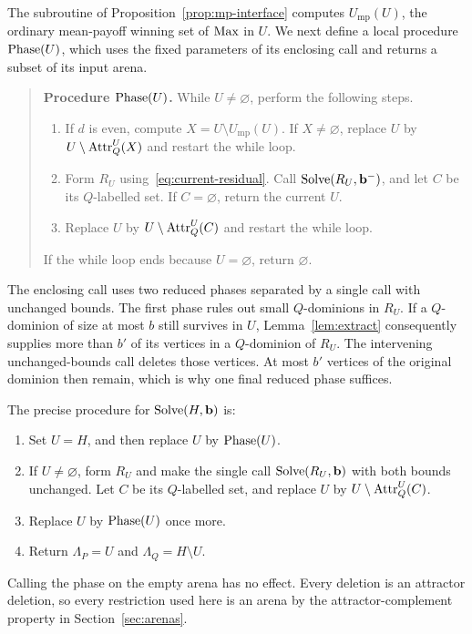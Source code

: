 The subroutine of Proposition~\ref{prop:mp-interface} computes
$U_{\mathrm{mp}}(U)$, the ordinary mean-payoff winning set of $\mathrm{Max}$
in $U$.  We next define a local procedure $\operatorname{Phase}(U)$, which uses the
fixed parameters of its enclosing call and returns a subset of its
input arena.

\begin{quote}
\textbf{Procedure $\operatorname{Phase}(U)$.}
While $U\ne\varnothing$, perform the following steps.
\begin{enumerate}
\item If $d$ is even, compute $X=U\setminus U_{\mathrm{mp}}(U)$.
      If $X\ne\varnothing$, replace
      $U$ by $U\setminus\operatorname{Attr}_Q^U(X)$ and restart the while loop.
\item Form $R_U$ using~\eqref{eq:current-residual}.  Call
      $\operatorname{Solve}(R_U,\mathbf b^-)$, and let $C$ be its $Q$-labelled set.
      If $C=\varnothing$, return the current $U$.
\item Replace $U$ by $U\setminus\operatorname{Attr}_Q^U(C)$ and restart the while loop.
\end{enumerate}
If the while loop ends because $U=\varnothing$, return $\varnothing$.
\end{quote}

The enclosing call uses two reduced phases separated by a single call
with unchanged bounds. The first phase rules out small $Q$-dominions
in $R_U$. If a $Q$-dominion of size at most $b$ still survives in $U$,
Lemma~\ref{lem:extract} consequently supplies more than $b'$ of its
vertices in a $Q$-dominion of $R_U$. The intervening unchanged-bounds
call deletes those vertices. At most $b'$ vertices of the original
dominion then remain, which is why one final reduced phase suffices.

\noindent\begin{minipage}{\linewidth}
The precise procedure for $\operatorname{Solve}(H,\mathbf b)$ is:
\begin{enumerate}
\renewcommand{\labelenumi}{\textnormal{(\roman{enumi})}}
\item Set $U=H$, and then replace $U$ by $\operatorname{Phase}(U)$.
\item If $U\ne\varnothing$, form $R_U$ and make the single call
      $\operatorname{Solve}(R_U,\mathbf b)$ with both bounds unchanged.  Let $C$ be its
      $Q$-labelled set, and replace $U$ by
      $U\setminus\operatorname{Attr}_Q^U(C)$.
\item Replace $U$ by $\operatorname{Phase}(U)$ once more.
\item Return $\Lambda_P=U$ and $\Lambda_Q=H\setminus U$.
\end{enumerate}
\end{minipage}\par\medskip
Calling the phase on the empty arena has no effect.  Every deletion is
an attractor deletion, so every restriction used here is an arena by
the attractor-complement property in Section~\ref{sec:arenas}.

